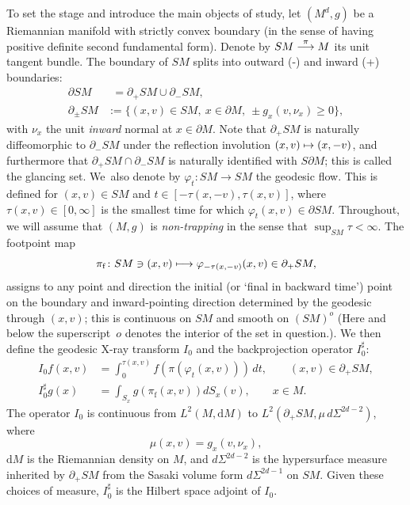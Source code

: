 \documentclass[JEP,XML,SOM,Unicode,NoFloatCountersInSection, NoEqCountersInSection,published]{cedram}
\def\mto{\mathchoice{\longmapsto}{\mapsto}{\mapsto}{\mapsto}}
\def\To#1{\mathchoice{\xrightarrow{\textstyle\kern4pt#1\kern3pt}}{\stackrel{#1}{\longrightarrow}}{}{}}
\theoremstyle{plain}
\theoremstyle{definition}
\theoremstyle{remark}
\newcommand{\adj}{I_0^\sharp}
\newcommand {\dM}{\mathrm{d}M}
\newcommand{\foot}{{\pi_{\mathrm f}}}
\begin{document}
To set the stage and introduce the main objects of study, let $(M^d,g)$ be a Riemannian manifold with strictly convex boundary (in the sense of
having positive definite second fundamental form). Denote by $SM\To{\pi} M$ its unit tangent bundle. The boundary of
$SM$ splits into outward (-) and inward (+) boundaries:
\begin{equation}
\begin{aligned}
\partial SM &\phantom{:}= \partial_+ SM \cup \partial_- SM, \\
\partial_\pm SM &:= \{ (x,v)\in SM,\ x\in \partial M,\ \pm g_x(v,\nu_x)\ge 0 \},
\label{eq:dSM}
\end{aligned}
\end{equation}
with $\nu_x$ the unit {\it inward} normal at $x\in \partial M$. Note that $\partial_+ SM$ is naturally diffeomorphic to
$\partial_- SM$ under the reflection involution $(x,v)\mto (x,-v)$, and furthermore that $\partial_+ SM \cap \partial_-SM$ is naturally identified
with $S\partial M$; this is called the glancing set. We~also denote by $\varphi_t \colon SM\to SM$ the geodesic flow. This is
defined for $(x,v)\in SM$ and $t\in [-\tau(x,-v),\tau(x,v)]$, where $\tau(x,v) \in [0,\infty]$ is the smallest time for which
$\varphi_t(x,v) \in \partial SM$. Throughout, we will assume that $(M,g)$ is {\em non-trapping} in the sense that
$\sup_{SM} \tau <\infty$. The footpoint map
\begin{equation*}%
\foot\colon SM\ni (x,v) \mto \varphi_{-\tau(x,-v)} (x,v) \in \partial_+ SM,
\end{equation*}
assigns to any point and direction the initial (or `final in backward time') point on the boundary and inward-pointing direction determined by the geodesic through $(x,v)$;
this is continuous on $SM$ and smooth on $(SM)^{o}$ (Here and below the superscript~$o$ deno\-tes the interior of the set in question.). We then define the geodesic X-ray transform $I_0$ and the backprojection operator $\adj$:
\begin{align}
I_0 f (x,v) &= \int_0^{\tau(x,v)} f(\pi (\varphi_t(x,v)))\,dt, \qquad (x,v) \in \partial_+ SM, \label{eq:forward} \\
\adj g (x) &= \int_{S_x} g(\foot (x,v)) dS_x(v), \qquad x \in M. \label{eq:adjoint}
\end{align}
The operator $I_0$ is continuous from $L^2(M, \dM)$ to $L^2(\partial_+ SM, \mu\, d\Sigma^{2d-2})$, where
\[
\mu(x,v) = g_x(v,\nu_x),
\]
$\dM$ is the Riemannian density on $M$, and $d\Sigma^{2d-2}$ is the hypersurface measure inher\-ited by $\partial_+ SM$ from the Sasaki volume form $d\Sigma^{2d-1}$ on $SM$. Given these choices of measure, $\adj $ is the Hilbert space adjoint of $I_0$.
\end{document}

